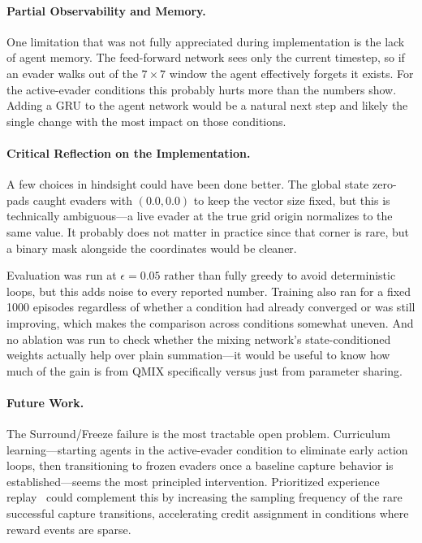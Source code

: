 \documentclass[sigconf,screen]{acmart}
\begin{document}
\paragraph{Partial Observability and Memory.}
One limitation that was not fully appreciated during implementation is the lack of agent memory. The feed-forward network sees only the current timestep, so if an evader walks out of the $7{\times}7$ window the agent effectively forgets it exists. For the active-evader conditions this probably hurts more than the numbers show. Adding a GRU to the agent network would be a natural next step and likely the single change with the most impact on those conditions.

\paragraph{Critical Reflection on the Implementation.}
A few choices in hindsight could have been done better. The global state zero-pads caught evaders with $(0.0, 0.0)$ to keep the vector size fixed, but this is technically ambiguous---a live evader at the true grid origin normalizes to the same value. It probably does not matter in practice since that corner is rare, but a binary mask alongside the coordinates would be cleaner.

Evaluation was run at $\epsilon = 0.05$ rather than fully greedy to avoid deterministic loops, but this adds noise to every reported number. Training also ran for a fixed 1000 episodes regardless of whether a condition had already converged or was still improving, which makes the comparison across conditions somewhat uneven. And no ablation was run to check whether the mixing network's state-conditioned weights actually help over plain summation---it would be useful to know how much of the gain is from QMIX specifically versus just from parameter sharing.

\paragraph{Future Work.}
The Surround/Freeze failure is the most tractable open problem. Curriculum learning---starting agents in the active-evader condition to eliminate early action loops, then transitioning to frozen evaders once a baseline capture behavior is established---seems the most principled intervention. Prioritized experience replay~\cite{schaul2015prioritized} could complement this by increasing the sampling frequency of the rare successful capture transitions, accelerating credit assignment in conditions where reward events are sparse.
\end{document}

